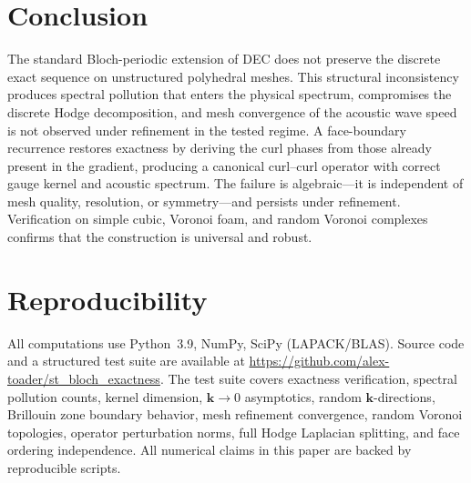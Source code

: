 \documentclass[preprint,12pt]{elsarticle}
\begin{document}
\section{Conclusion}
\label{sec:conclusion}

The standard Bloch-periodic extension of DEC does not preserve the discrete exact sequence on unstructured polyhedral meshes. This structural inconsistency produces spectral pollution that enters the physical spectrum, compromises the discrete Hodge decomposition, and mesh convergence of the acoustic wave speed is not observed under refinement in the tested regime. A face-boundary recurrence restores exactness by deriving the curl phases from those already present in the gradient, producing a canonical curl--curl operator with correct gauge kernel and acoustic spectrum. The failure is algebraic---it is independent of mesh quality, resolution, or symmetry---and persists under refinement. Verification on simple cubic, Voronoi foam, and random Voronoi complexes confirms that the construction is universal and robust.

\section*{Reproducibility}

All computations use Python~3.9, NumPy, SciPy (LAPACK/BLAS). Source code and a structured test suite are available at \url{https://github.com/alex-toader/st_bloch_exactness}. The test suite covers exactness verification, spectral pollution counts, kernel dimension, $\mathbf{k} \to 0$ asymptotics, random $\mathbf{k}$-directions, Brillouin zone boundary behavior, mesh refinement convergence, random Voronoi topologies, operator perturbation norms, full Hodge Laplacian splitting, and face ordering independence. All numerical claims in this paper are backed by reproducible scripts.


\end{document}
